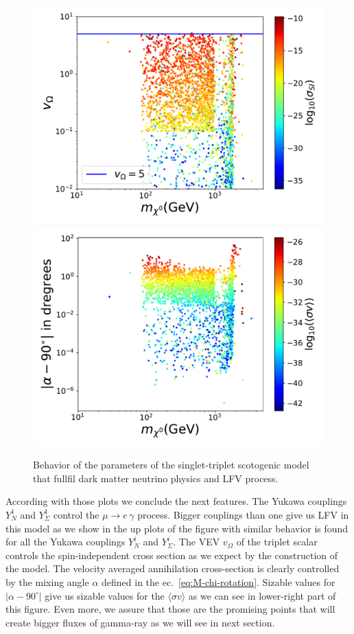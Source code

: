 \documentclass[12pt,letterpaper]{article}
\begin{document}
\begin{figure}
\begin{center}
\includegraphics[scale=0.4]{vT}
\includegraphics[scale=0.4]{alpha}
\caption{Behavior of the parameters of the singlet-triplet scotogenic model that fullfil dark matter neutrino physics and LFV process.}
\label{fig:model-parameters}
\end{center}
\end{figure}
%
According with those plots we conclude the next features. The Yukawa couplings $Y_{N}^1$ and $Y_{\Sigma}^1$ control the $\mu\rightarrow e\,\gamma$ process. Bigger couplings than one give us LFV in this model as we show in the up plots of the figure with similar behavior is found for all the Yukawa couplings $Y_{N}^i$ and $Y_{\Sigma}^i$.
The VEV $v_{\Omega}$ of the triplet scalar controls the spin-independent cross section as we expect by the construction of the model. 
The velocity averaged annihilation cross-section is clearly controlled by the mixing angle $\alpha$ defined in the ec.~\ref{eq:M-chi-rotation}. 
Sizable values for $|\alpha-90^{\circ}|$ give us sizable values for the $\langle\sigma v\rangle$ as we can see in lower-right part of this figure. Even more, we assure that those are the promising points that will create bigger fluxes of gamma-ray as we will see in next section.
\end{document}
